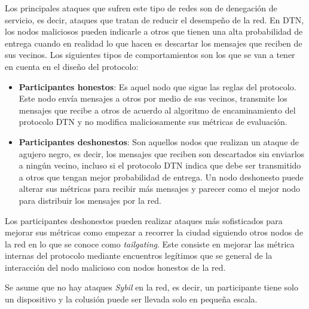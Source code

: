 Los principales ataques que sufren este tipo de redes son de denegación de
servicio, es decir, ataques que tratan de reducir el desempeño de la red. En
DTN, los nodos maliciosos pueden indicarle a otros que tienen una alta
probabilidad de entrega cuando en realidad lo que hacen es descartar los
mensajes que reciben de sus vecinos. Los siguientes tipos de comportamientos son
los que se van a tener en cuenta en el diseño del protocolo:

\begin{itemize}
  \item \textbf{Participantes honestos}: Es aquel nodo que sigue las reglas del
  protocolo. Este nodo envía mensajes a otros por medio de sus vecinos,
  transmite los mensajes que recibe a otros de acuerdo al algoritmo de
  encaminamiento del protocolo DTN y no modifica maliciosamente sus métricas de
  evaluación.
  \item \textbf{Participantes deshonestos}: Son aquellos nodos que realizan un
    ataque de agujero negro, es decir, los mensajes que reciben son descartados
    sin enviarlos a ningún vecino, incluso si el protocolo DTN indica que debe
    ser transmitido a otros que tengan mejor probabilidad de entrega. Un nodo
    deshonesto puede alterar sus métricas para recibir más mensajes y parecer
    como el mejor nodo para distribuir los mensajes por la red.
\end{itemize}

Los participantes deshonestos pueden realizar ataques más sofisticados para
mejorar sus métricas como empezar a recorrer la ciudad siguiendo otros nodos de
la red en lo que se conoce como \textit{tailgating}. Este consiste en mejorar
las métrica internas del protocolo mediante encuentros legítimos que se general
de la interacción del nodo malicioso con nodos honestos de la red.


Se asume que no hay ataques \textit{Sybil} en la red, es decir, un participante tiene
solo un dispositivo y la colusión puede ser llevada solo en pequeña escala.



